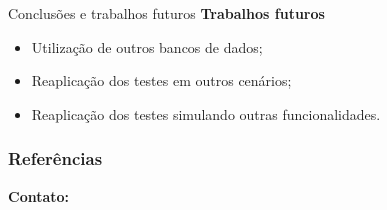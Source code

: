 \documentclass{libs/ufc_format}
\begin{document}
\begin{frame}{Conclusões e trabalhos futuros}
    \textbf{Trabalhos futuros}
    \begin{itemize}
        \item Utilização de outros bancos de dados;
        \vspace*{0.5em}
        \item Reaplicação dos testes em outros cenários;
        \vspace*{0.5em}
        \item Reaplicação dos testes simulando outras funcionalidades.
    \end{itemize}
\end{frame}

\begin{frame}[allowframebreaks]
    \frametitle{Referências}
    \printbibliography
\end{frame}

\begin{frame}{}
    \centering
    \huge{
        \textbf{
    }}

    \vspace{0.5cm}

    \huge{
        \textbf{
    }}
    
    \vspace{1cm}
    
    \Large{\textbf{Contato:}}
    \newline
    \vspace*{0.5cm}
    \large{}
\end{frame}



\begin{frame}{}
    \maketitle
\end{frame}
\end{document}
